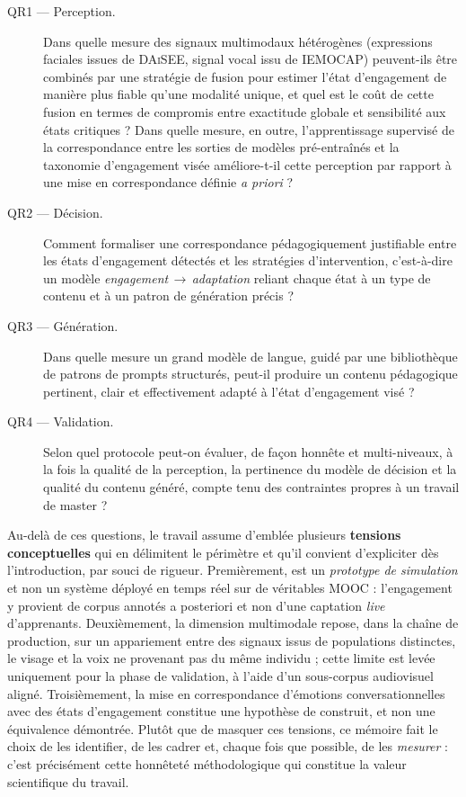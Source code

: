 \begin{description}
  \item[QR1 — Perception.] Dans quelle mesure des signaux multimodaux
  hétérogènes (expressions faciales issues de \textsc{DAiSEE}, signal vocal issu
  de \textsc{IEMOCAP}) peuvent-ils être combinés par une stratégie de fusion pour
  estimer l'état d'engagement de manière plus fiable qu'une modalité unique, et
  quel est le coût de cette fusion en termes de compromis entre exactitude
  globale et sensibilité aux états critiques ? Dans quelle mesure, en outre,
  l'apprentissage supervisé de la correspondance entre les sorties de modèles
  pré-entraînés et la taxonomie d'engagement visée améliore-t-il cette perception
  par rapport à une mise en correspondance définie \emph{a priori} ?

  \item[QR2 — Décision.] Comment formaliser une correspondance pédagogiquement
  justifiable entre les états d'engagement détectés et les stratégies
  d'intervention, c'est-à-dire un modèle \emph{engagement\,$\rightarrow$\,adaptation}
  reliant chaque état à un type de contenu et à un patron de génération précis ?

  \item[QR3 — Génération.] Dans quelle mesure un grand modèle de langue, guidé
  par une bibliothèque de patrons de prompts structurés, peut-il produire un
  contenu pédagogique pertinent, clair et effectivement adapté à l'état
  d'engagement visé ?

  \item[QR4 — Validation.] Selon quel protocole peut-on évaluer, de façon
  honnête et multi-niveaux, à la fois la qualité de la perception, la pertinence
  du modèle de décision et la qualité du contenu généré, compte tenu des
  contraintes propres à un travail de master ?
\end{description}

Au-delà de ces questions, le travail assume d'emblée plusieurs
\textbf{tensions conceptuelles} qui en délimitent le périmètre et qu'il convient
d'expliciter dès l'introduction, par souci de rigueur. Premièrement, \emolearn{}
est un \emph{prototype de simulation} et non un système déployé en temps réel sur
de véritables MOOC : l'engagement y provient de corpus annotés a posteriori et
non d'une captation \emph{live} d'apprenants. Deuxièmement, la dimension
multimodale repose, dans la chaîne de production, sur un appariement entre des
signaux issus de populations distinctes, le visage et la voix ne provenant pas du
même individu ; cette limite est levée uniquement pour la phase de validation, à
l'aide d'un sous-corpus audiovisuel aligné. Troisièmement, la mise en
correspondance d'émotions conversationnelles avec des états d'engagement constitue
une hypothèse de construit, et non une équivalence démontrée. Plutôt que de
masquer ces tensions, ce mémoire fait le choix de les identifier, de les cadrer et,
chaque fois que possible, de les \emph{mesurer} : c'est précisément cette honnêteté
méthodologique qui constitue la valeur scientifique du travail.

